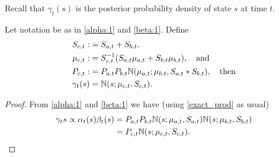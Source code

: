 \documentclass[12pt,leqno]{article}
\begin{document}
Recall that $\gamma_t(s)$ is the posterior probability density of state $s$
at time $t$. 
\begin{Thm}
  Let notation be as in \eqref{alpha:1} and \eqref{beta:1}.  Define
\begin{align*}
  S_{c,t} :&= S_{a,t} + S_{b,t}, \\
  \mu_{c,t} :&= S_{c,t}^{-1}(S_{a,t}\mu_{a,t} + S_{b,t}\mu_{b,t}), \quad\text{and}\\
  P_{c,t} :&= P_{a,t}P_{b,t}{\mathbb N}(\mu_{a,t};\mu_{b,t},S_{a,t}*S_{b,t}), \quad\text{then} \\
 \gamma_t(s) &= {\mathbb N}(s;\mu_{c,t},S_{c,t}).
  \end{align*}
\end{Thm}
\begin{proof}
  From \eqref{alpha:1} and \eqref{beta:1} we have (using \eqref{exact_prod}
  as usual)
  \begin{align*}
  \gamma_t{s} \propto \alpha_t(s)\beta_t(s) &= P_{a,t}P_{b,t}{\mathbb N}(s;\mu_{a,t},S_{a,t}){\mathbb N}(s;\mu_{b,t},S_{b,t})\\
  &= P_{c,t}{\mathbb N}(s;\mu_{c,t},S_{c,t}).
  \end{align*}
\end{proof}
\end{document}
